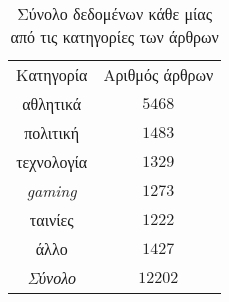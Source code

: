 \begin{table}[htb]
    \captionsetup{justification=centering}
    \begin{center}
        \caption{Σύνολο δεδομένων κάθε μίας από τις κατηγορίες των άρθρων}
        \begin{tabular}{ | c | c |}
            \hline
            \rowcolor{Gray}
            Κατηγορία & Αριθμός άρθρων\\
            αθλητικά & $5468$\\
            πολιτική & $1483$\\
            τεχνολογία & $1329$\\
            \emph{gaming} & $1273$\\
            ταινίες &  $1222$\\
            άλλο & $1427$\\
            \hline
            \hline
            \emph{Σύνολο} & $12202$\\
            \hline
        \end{tabular}
        \label{tab:dataset}
    \end{center}
\end{table}